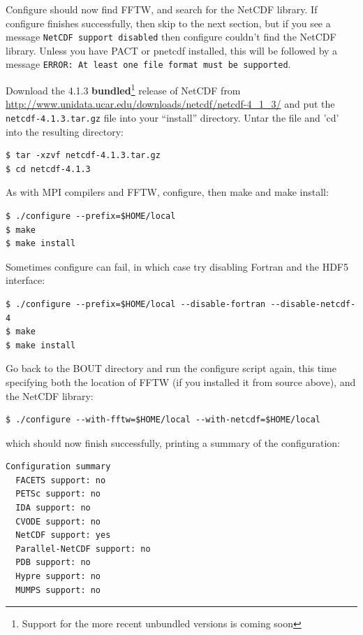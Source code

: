 \documentclass[12pt]{article}
\begin{document}
Configure should now find FFTW, and search for the NetCDF library. If
configure finishes successfully, then skip to the next section, but if you
see a message \texttt{NetCDF support disabled} then configure couldn't find
the NetCDF library. Unless you have PACT or pnetcdf installed, this will be
followed by a message \texttt{ERROR: At least one file format must be supported}.

Download the 4.1.3 {\bf bundled}\footnote{Support for the more recent unbundled versions is coming soon} release of NetCDF from \url{http://www.unidata.ucar.edu/downloads/netcdf/netcdf-4_1_3/} and put the \texttt{netcdf-4.1.3.tar.gz} file into your ``install'' directory. Untar the file and 'cd' into the resulting directory:
\begin{verbatim}
$ tar -xzvf netcdf-4.1.3.tar.gz
$ cd netcdf-4.1.3
\end{verbatim}
As with MPI compilers and FFTW, configure, then make and make install:
\begin{verbatim}
$ ./configure --prefix=$HOME/local
$ make
$ make install
\end{verbatim}
Sometimes configure can fail, in which case try disabling Fortran and the
HDF5 interface:
\begin{verbatim}
$ ./configure --prefix=$HOME/local --disable-fortran --disable-netcdf-4
$ make
$ make install
\end{verbatim}


Go back to the BOUT directory and run the configure script again,
this time specifying both the location of FFTW (if you installed it
from source above), and the NetCDF library:
\begin{verbatim}
$ ./configure --with-fftw=$HOME/local --with-netcdf=$HOME/local
\end{verbatim}

which should now finish successfully, printing a summary of the configuration:
\begin{verbatim}
Configuration summary
  FACETS support: no
  PETSc support: no
  IDA support: no
  CVODE support: no
  NetCDF support: yes
  Parallel-NetCDF support: no
  PDB support: no
  Hypre support: no
  MUMPS support: no
\end{verbatim}
\end{document}
